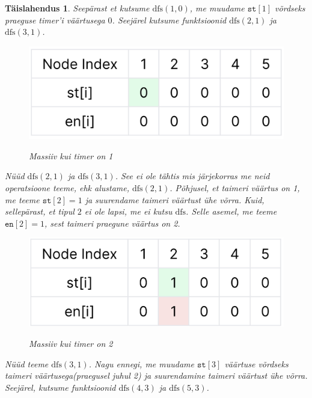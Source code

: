 \documentclass{trkut}
\newtheorem*{solution}{Täislahendus}
\begin{document}
\begin{solution}
Seepärast et kutsume $\text{dfs}(1, 0)$, me muudame $\texttt{st}[1]$ võrdseks praeguse timer'i väärtusega $0$. Seejärel kutsume funktsioonid $\text{dfs}(2, 1)$ ja
$\text{dfs}(3, 1)$.

\begin{figure}[H]%
    \includegraphics[width=12cm]{second.jpeg}%
    \caption{Massiiv kui timer on 1}%
    \label{joonis}%
\end{figure}

Nüüd $\text{dfs}(2, 1)$ ja $\text{dfs}(3, 1)$. 
See ei ole tähtis mis järjekorras me neid operatsioone teeme, ehk alustame,
$\text{dfs}(2, 1)$. Põhjusel, et taimeri väärtus on 1, me teeme $\texttt{st}[2]=1$ ja suurendame taimeri väärtust ühe võrra. Kuid, sellepärast, et tipul $2$ ei ole lapsi, me ei kutsu
$\text{dfs}$. Selle asemel, me teeme $\texttt{en}[2]=1$, sest taimeri praegune väärtus on 2.

\begin{figure}[H]%
    \includegraphics[width=12cm]{third.jpeg}%
    \caption{Massiiv kui timer on 2}%
    \label{joonis}%
\end{figure}

Nüüd teeme $\text{dfs}(3, 1)$. 
Nagu ennegi, me muudame
$\texttt{st}[3]$ väärtuse võrdseks taimeri väärtusega(praegusel juhul 2) ja suurendamine taimeri väärtust ühe võrra. 
Seejärel, kutsume funktsioonid $\text{dfs}(4, 3)$ ja
$\text{dfs}(5, 3)$.


\end{solution}
\end{document}
